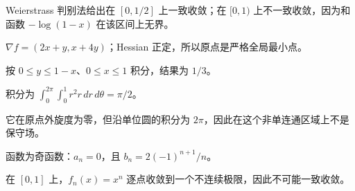 \begin{selectedhints}
    \item Weierstrass 判别法给出在 $[0,1/2]$ 上一致收敛；在 $[0,1)$ 上不一致收敛，因为和函数 $-\log(1-x)$ 在该区间上无界。
    \item $\nabla f=(2x+y,x+4y)$；Hessian 正定，所以原点是严格全局最小点。
    \item 按 $0\le y\le1-x$、$0\le x\le1$ 积分，结果为 $1/3$。
    \item 积分为 $\int_0^{2\pi}\int_0^1 r^2 r\,dr\,d\theta=\pi/2$。
    \item 它在原点外旋度为零，但沿单位圆的积分为 $2\pi$，因此在这个非单连通区域上不是保守场。
    \item 函数为奇函数：$a_n=0$，且 $b_n=2(-1)^{n+1}/n$。
    \item 在 $[0,1]$ 上，$f_n(x)=x^n$ 逐点收敛到一个不连续极限，因此不可能一致收敛。
\end{selectedhints}
